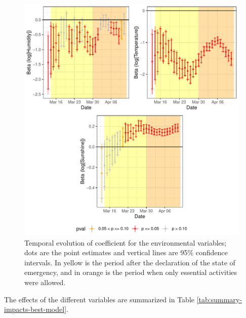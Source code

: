 \documentclass[]{elsarticle} %
\makeatletter
\def\maxwidth{\ifdim\Gin@nat@width>\linewidth\linewidth
\else\Gin@nat@width\fi}
\let\Oldincludegraphics\includegraphics
\renewcommand{\includegraphics}[1]{\Oldincludegraphics[width=\maxwidth]{#1}}
\makeatother
\begin{document}
\begin{figure}
\centering
\includegraphics{Environmental-Correlates-of-COVID19-Spain_files/figure-latex/beta-environmental-time-1.pdf}
\caption{\label{fig:beta-environmental-time}Temporal evolution of
coefficient for the environmental variables; dots are the point
estimates and vertical lines are 95\% confidence intervals. In yellow is
the period after the declaration of the state of emergency, and in
orange is the period when only essential activities were allowed.}
\end{figure}

The effects of the different variables are summarized in Table
\ref{tab:summary-impacts-best-model}.
\end{document}
